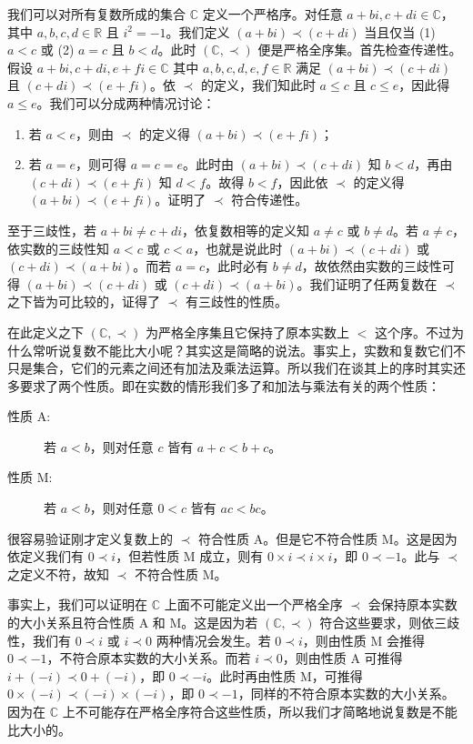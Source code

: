 \begin{example}
我们可以对所有复数所成的集合 $\mathbb{C}$ 定义一个严格序。对任意 $a + bi, c + di \in \mathbb{C}$，其中 $a, b, c, d \in \mathbb{R}$ 且 $i^2 = -1$。我们定义 $(a + bi) \prec (c + di)$ 当且仅当 (1) $a < c$ 或 (2) $a = c$ 且 $b < d$。此时 $(\mathbb{C}, \prec)$ 便是严格全序集。首先检查传递性。假设 $a + bi, c + di, e + fi \in \mathbb{C}$ 其中 $a, b, c, d, e, f \in \mathbb{R}$ 满足 $(a + bi) \prec (c + di)$ 且 $(c + di) \prec (e + fi)$。依 $\prec$ 的定义，我们知此时 $a \leq c$ 且 $c \leq e$，因此得 $a \leq e$。我们可以分成两种情况讨论：
\begin{enumerate}
    \item 若 $a < e$，则由 $\prec$ 的定义得 $(a + bi) \prec (e + fi)$；
    \item 若 $a = e$，则可得 $a = c = e$。此时由 $(a + bi) \prec (c + di)$ 知 $b < d$，再由 $(c + di) \prec (e + fi)$ 知 $d < f$。故得 $b < f$，因此依 $\prec$ 的定义得 $(a + bi) \prec (e + fi)$。证明了 $\prec$ 符合传递性。
\end{enumerate}
至于三歧性，若 $a + bi \neq c + di$，依复数相等的定义知 $a \neq c$ 或 $b \neq d$。若 $a \neq c$，依实数的三歧性知 $a < c$ 或 $c < a$，也就是说此时 $(a + bi) \prec (c + di)$ 或 $(c + di) \prec (a + bi)$。而若 $a = c$，此时必有 $b \neq d$，故依然由实数的三歧性可得 $(a + bi) \prec (c + di)$ 或 $(c + di) \prec (a + bi)$。我们证明了任两复数在 $\prec$ 之下皆为可比较的，证得了 $\prec$ 有三歧性的性质。

在此定义之下 $(\mathbb{C}, \prec)$ 为严格全序集且它保持了原本实数上 $<$ 这个序。不过为什么常听说复数不能比大小呢？其实这是简略的说法。事实上，实数和复数它们不只是集合，它们的元素之间还有加法及乘法运算。所以我们在谈其上的序时其实还多要求了两个性质。即在实数的情形我们多了和加法与乘法有关的两个性质：
\begin{description}
    \item[性质 A:] 若 $a < b$，则对任意 $c$ 皆有 $a + c < b + c$。
    \item[性质 M:] 若 $a < b$，则对任意 $0 < c$ 皆有 $ac < bc$。
\end{description}
很容易验证刚才定义复数上的 $\prec$ 符合性质 A。但是它不符合性质 M。这是因为依定义我们有 $0 \prec i$，但若性质 M 成立，则有 $0 \times i \prec i \times i$，即 $0 \prec -1$。此与 $\prec$ 之定义不符，故知 $\prec$ 不符合性质 M。

事实上，我们可以证明在 $\mathbb{C}$ 上面不可能定义出一个严格全序 $\prec$ 会保持原本实数的大小关系且符合性质 A 和 M。这是因为若 $(\mathbb{C}, \prec)$ 符合这些要求，则依三歧性，我们有 $0 \prec i$ 或 $i \prec 0$ 两种情况会发生。若 $0 \prec i$，则由性质 M 会推得 $0 \prec -1$，不符合原本实数的大小关系。而若 $i \prec 0$，则由性质 A 可推得 $i + (-i) \prec 0 + (-i)$，即 $0 \prec -i$。此时再由性质 M，可推得 $0 \times (-i) \prec (-i) \times (-i)$，即 $0 \prec -1$，同样的不符合原本实数的大小关系。因为在 $\mathbb{C}$ 上不可能存在严格全序符合这些性质，所以我们才简略地说复数是不能比大小的。
\end{example}

